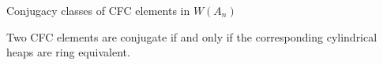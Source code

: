 \documentclass[9pt,handout]{beamer}
\newcommand{\CFC}{\mathrm{CFC}}
\newcommand\xxaxis{0}
\newcommand\yyaxis{90}
\newcommand\sq[2]{
    \fill[fill=gray!25, draw=black, rounded corners, line width=1pt, shift={(\xxaxis:#1)}, shift={(\yyaxis:#2)}] 
    (0,0) -- (1,0) -- (1,-1) -- (0,-1) -- cycle; }
\begin{document}

\begin{frame}{Conjugacy classes of CFC elements in $W(A_n)$}
\begin{theorem}[Fox] Two CFC elements are conjugate if and only if the corresponding cylindrical heaps are ring equivalent.
\end{theorem}
%
%
\end{frame}
\end{document}
